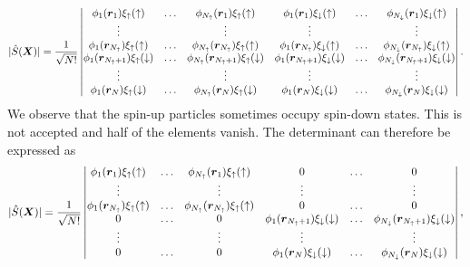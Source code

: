 \begin{equation*}
|\hat{S}(\boldsymbol{{X}})|=\frac{1}{\sqrt{N!}}
\begin{vmatrix}
\phi_1(\boldsymbol{r}_1)\xi_{\uparrow}(\uparrow) & \hdots & \phi_{N_{\uparrow}}(\boldsymbol{r}_1)\xi_{\uparrow}(\uparrow) & \phi_{1}(\boldsymbol{r}_1)\xi_{\downarrow}(\uparrow) & \hdots & \phi_{N_{\downarrow}}(\boldsymbol{r}_1)\xi_{\downarrow}(\uparrow)\\
\vdots & & \vdots & \vdots & & \vdots \\
\phi_1(\boldsymbol{r}_{N_{\uparrow}})\xi_{\uparrow}(\uparrow) & \hdots & \phi_{N_{\uparrow}}(\boldsymbol{r}_{N_{\uparrow}})\xi_{\uparrow}(\uparrow) & \phi_{1}(\boldsymbol{r}_{N_{\uparrow}})\xi_{\downarrow}(\uparrow) & \hdots & \phi_{N_{\downarrow}}(\boldsymbol{r}_{N_{\uparrow}})\xi_{\downarrow}(\uparrow)\\
\phi_1(\boldsymbol{r}_{N_{\uparrow}+1})\xi_{\uparrow}(\downarrow) & \hdots & \phi_{N_{\uparrow}}(\boldsymbol{r}_{N_{\uparrow}+1})\xi_{\uparrow}(\downarrow) & \phi_{1}(\boldsymbol{r}_{N_{\uparrow}+1})\xi_{\downarrow}(\downarrow) & \hdots & \phi_{N_{\downarrow}}(\boldsymbol{r}_{N_{\uparrow}+1})\xi_{\downarrow}(\downarrow)\\
\vdots & & \vdots & \vdots & & \vdots \\
\phi_1(\boldsymbol{r}_N)\xi_{\uparrow}(\downarrow) & \hdots & \phi_{N_{\uparrow}}(\boldsymbol{r}_N)\xi_{\uparrow}(\downarrow) & \phi_{1}(\boldsymbol{r}_N)\xi_{\downarrow}(\downarrow) & \hdots & \phi_{N_{\downarrow}}(\boldsymbol{r}_N)\xi_{\downarrow}(\downarrow)\\
\end{vmatrix}.
\end{equation*}
We observe that the spin-up particles sometimes occupy spin-down states. This is not accepted and half of the elements vanish. The determinant can therefore be expressed as
\begin{equation*}
|\hat{S}(\boldsymbol{{X}})|=\frac{1}{\sqrt{N!}}
\begin{vmatrix}
\phi_1(\boldsymbol{r}_1)\xi_{\uparrow}(\uparrow) & \hdots & \phi_{N_{\uparrow}}(\boldsymbol{r}_1)\xi_{\uparrow}(\uparrow) & 0 & \hdots & 0\\
\vdots & & \vdots & \vdots & & \vdots \\
\phi_1(\boldsymbol{r}_{N_{\uparrow}})\xi_{\uparrow}(\uparrow) & \hdots & \phi_{N_{\uparrow}}(\boldsymbol{r}_{N_{\uparrow}})\xi_{\uparrow}(\uparrow) & 0 & \hdots & 0\\
0 & \hdots & 0 & \phi_{1}(\boldsymbol{r}_{N_{\uparrow}+1})\xi_{\downarrow}(\downarrow) & \hdots & \phi_{N_{\downarrow}}(\boldsymbol{r}_{N_{\uparrow}+1})\xi_{\downarrow}(\downarrow)\\
\vdots & & \vdots & \vdots & & \vdots \\
0 & \hdots & 0 & \phi_{1}(\boldsymbol{r}_N)\xi_{\downarrow}(\downarrow) & \hdots & \phi_{N_{\downarrow}}(\boldsymbol{r}_N)\xi_{\downarrow}(\downarrow)\\
\end{vmatrix},
\end{equation*}
